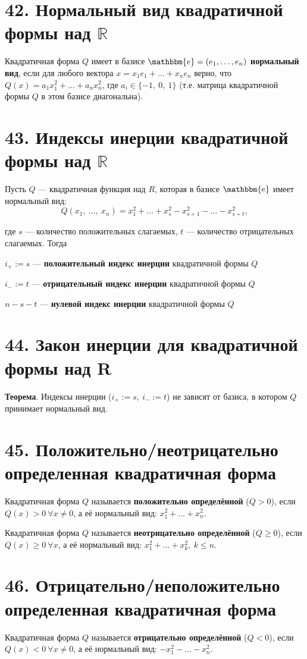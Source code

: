 \documentclass[a4paper, 12pt]{article}
\newcommand{\R}{\mathbb{R}}
\newcommand{\me}{\mathbbm{e}}
\begin{document}
\section*{42. Нормальный вид квадратичной формы над $\R$}
Квадратичная форма $Q$ имеет в базисе $\me = (e_1, \ldots, e_n)$ \textbf{нормальный вид}, если для любого вектора $x = x_1e_1 + \ldots + x_ne_n$ верно, что $Q(x) = a_1x_1^2 + \ldots + a_nx_n^2$, где $a_i \in \{-1,\ 0,\ 1\}$ (т.е. матрица квадратичной формы $Q$ в этом базисе диагональна).

\section*{43. Индексы инерции квадратичной формы над $\R$}
Пусть $Q$ --- квадратичная функция над $R$, которая в базисе $\me$ имеет нормальный вид:
\[
Q(x_1,\ \ldots,\ x_n) = x_1^2 + \ldots + x_s^2 - x_{s + 1}^2 - \ldots - x_{s + t}^2,
\]

где $s$ --- количество положительных слагаемых, $t$ --- количество отрицательных слагаемых. Тогда

$i_+ := s$ --- \textbf{положительный индекс инерции} квадратичной формы $Q$

$i_- := t$ --- \textbf{отрицательный индекс инерции} квадратичной формы $Q$

$n - s - t$ --- \textbf{нулевой индекс инерции} квадратичной формы $Q$

\section*{44. Закон инерции для квадратичной формы над R}
\textbf{Теорема}. Индексы инерции ($i_+ := s,\ i_- := t$) не зависят от базиса, в котором $Q$ принимает нормальный вид.

\section*{45. Положительно/неотрицательно определенная квадратичная форма}
Квадратичная форма $Q$ называется \textbf{положительно определённой} ($Q > 0$), если $Q(x) > 0\ \forall x \neq 0$, а её нормальный вид: $x_1^2 + \ldots + x_n^2$.

Квадратичная форма $Q$ называется \textbf{неотрицательно определённой} ($Q \geqslant 0$), если $Q(x) \geqslant 0\ \forall x$, а её нормальный вид: $x_1^2 + \ldots + x_k^2,\ k \leqslant n$.

\section*{46. Отрицательно/неположительно определенная квадратичная форма}
Квадратичная форма $Q$ называется \textbf{отрицательно определённой} ($Q < 0$), если $Q(x) < 0\ \forall x \neq 0$, а её нормальный вид: $-x_1^2 - \ldots - x_n^2$.
\end{document}
